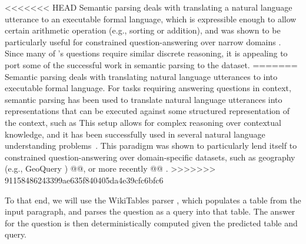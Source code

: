
<<<<<<< HEAD
Semantic parsing deals with translating a natural language utterance to
an executable formal language, which is expressible enough to allow certain arithmetic
operation (e.g., sorting or addition),  and
was shown to be particularly useful for constrained question-answering
over narrow domains \cite{Zelle1996LearningTP,Zettlemoyer2005LearningTM,Berant2014ModelingBP}.
Since many of \drop's questions require similar discrete reasoning, it is appealing
to port some of the successful work in semantic parsing to the \drop dataset.
=======
Semantic parsing deals with translating natural language utterances to
into executable formal language. For tasks requiring answering questions in context, semantic parsing
has been used to translate natural language utterances into representations that can be
executed against some structured representation of the context, such as 
This setup allows for complex reasoning over contextual knowledge, and it has
been successfully used in several natural language understanding
problems~\citep[among others]{berant2013semantic,Yin2017ASN,chen2011learning}.
This paradigm was shown to particularly lend itself to constrained question-answering
over domain-specific datasets, such as geography (e.g., GeoQuery \cite{geoquery})
@@, or more recently @@ .
>>>>>>> 91158486243399ae635f840405da4e39cfc6bfc6

To that end, we will use the WikiTables parser \cite{Krishnamurthy2017neuralsp},
which populates a table from the input paragraph, and
parses the question as a query into that table.
The answer for the question is then deterministically computed given the predicted table
and query.

